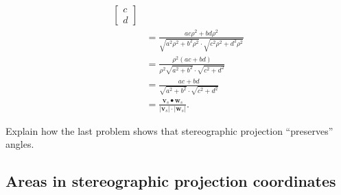 \documentclass[newpage,hints,12pt,noauthor,nooutcomes]{ximera}
\begin{document}
\begin{problem}
\begin{freeResponse}
\begin{align*}
{{\begin{bmatrix}
            c\\
            d
          \end{bmatrix}}
        }\\
        &= \frac{ac\rho^2 + bd\rho^2}{\sqrt{a^2\rho^2+b^2\rho^2}\cdot \sqrt{c^2\rho^2+d^2\rho^2}}\\
        &= \frac{\rho^2(ac + bd)}{\rho^2\sqrt{a^2+b^2}\cdot \sqrt{c^2+d^2}}\\
        &= \frac{ac + bd}{\sqrt{a^2+b^2}\cdot \sqrt{c^2+d^2}}\\
        &=\frac{\mathbf{v}_s\bullet \mathbf{w}_s}{|\mathbf{v}_s|\cdot|\mathbf{w}_s|}.
    \end{align*}
  \end{freeResponse}
\end{problem}


\begin{problem}
  Explain how the last problem shows that stereographic projection
  ``preserves'' angles. 
\end{problem}




















\subsection{Areas in stereographic projection coordinates}
\end{document}

